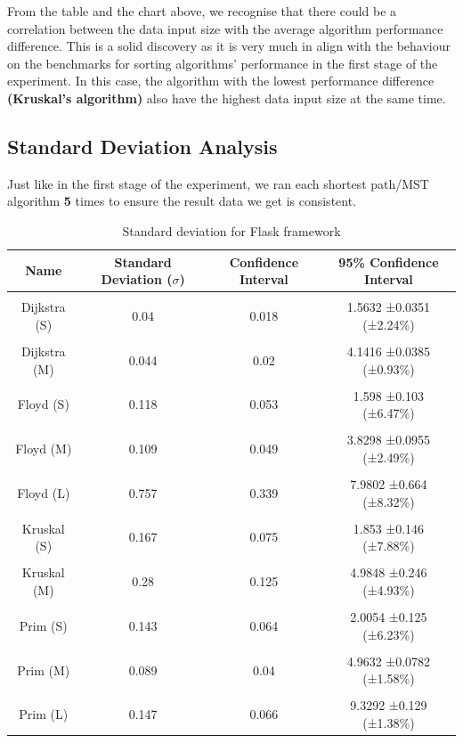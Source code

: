 From the table and the chart above, we recognise that there could be a correlation between the data input size with the average algorithm performance difference. This is a solid discovery as it is very much in align with the behaviour on the benchmarks for sorting algorithms' performance in the first stage of the experiment. In this case, the algorithm with the lowest performance difference \textbf{(Kruskal's algorithm)} also have the highest data input size at the same time.

\subsection{Standard Deviation Analysis}

Just like in the first stage of the experiment, we ran each shortest path/MST algorithm \textbf{5} times to ensure the result data we get is consistent.

\newpage
\bigskip
\begin{table}[h!]
\centering
\begin{tabular}{||c c c c||} 
\hline
Name & Standard Deviation ($\sigma$) & Confidence Interval & 95\% Confidence Interval \\ [1ex] 
\hline\hline
 & & & \\
Dijkstra (S) & 0.04 & 0.018 & 1.5632 ±0.0351 (±2.24\%) \\
 & & & \\
Dijkstra (M) & 0.044 & 0.02 & 4.1416 ±0.0385 (±0.93\%) \\
 & & & \\
Floyd (S) & 0.118 & 0.053 & 1.598 ±0.103 (±6.47\%) \\
 & & & \\
Floyd (M) & 0.109 & 0.049 & 3.8298 ±0.0955 (±2.49\%) \\
 & & & \\
Floyd (L) & 0.757 & 0.339 & 7.9802 ±0.664 (±8.32\%) \\
 & & & \\
Kruskal (S) & 0.167 & 0.075 & 1.853 ±0.146 (±7.88\%) \\
 & & & \\
Kruskal (M) & 0.28 & 0.125 & 4.9848 ±0.246 (±4.93\%) \\
 & & & \\
Prim (S) & 0.143 & 0.064 & 2.0054 ±0.125 (±6.23\%) \\
 & & & \\
Prim (M) & 0.089 & 0.04 & 4.9632 ±0.0782 (±1.58\%) \\
 & & & \\
Prim (L) & 0.147 & 0.066 & 9.3292 ±0.129 (±1.38\%) \\ [1ex]
\hline
\end{tabular}
\caption{Standard deviation for Flask framework}
\label{table:time_complexity_2}
\end{table}
\bigskip

